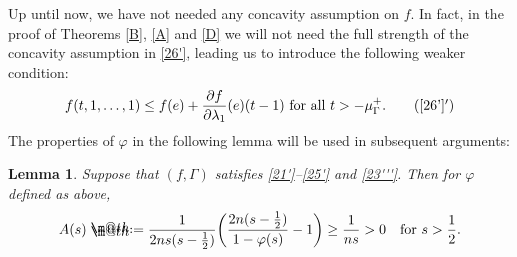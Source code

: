 \documentclass[12pt]{article}
\makeatletter
\numberwithin{equation}{section}
\theoremstyle{plain}
\newtheorem{lem}[thm]{Lemma}
\theoremstyle{definition}
\renewcommand{\phi}{\varphi}
\newcommand*{\defeq}{\mathrel{\rlap{%
			\raisebox{0.3ex}{$\m@th\cdot$}}%
		\raisebox{-0.3ex}{$\m@th\cdot$}}%
	=}
\makeatother
\begin{document}
Up until now, we have not needed any concavity assumption on $f$. In fact, in the proof of Theorems \ref{B}, \ref{A} and \ref{D} we will not need the full strength of the concavity assumption in \eqref{26'}, leading us to introduce the following weaker condition:
\begin{align}
f(t,1,\dots,1) \leq f(e) + \frac{\partial f}{\partial \lambda_1}(e)(t-1) \text{ for all }t>-\mu_\Gamma^+. \tag{\ref{26'}$'$} \label{23'''}
\end{align}
The properties of $\phi$ in the following lemma will be used in subsequent arguments: 

\begin{lem}\label{115}
	Suppose that $(f,\Gamma)$ satisfies \eqref{21'}--\eqref{25'} and \eqref{23'''}. Then for $\phi$ defined as above,
		\begin{align}\label{119}
		A(s) \defeq \frac{1}{2ns(s-\frac{1}{2})}\bigg(\frac{2n(s-\frac{1}{2})}{1-\phi(s)}-1\bigg) \geq \frac{1}{ns}>0 \quad \text{for }s>\frac{1}{2}.
		\end{align}

\end{lem}
\end{document}
